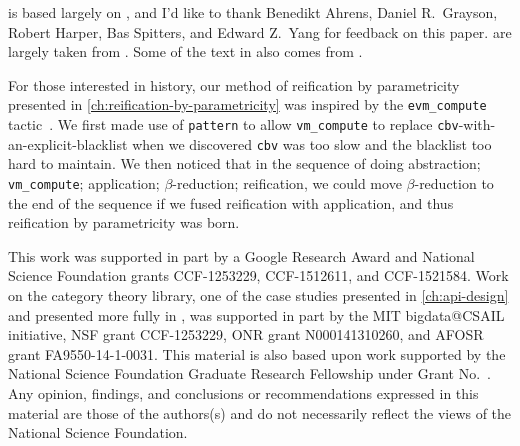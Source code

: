  is based largely on , and I'd like to thank Benedikt Ahrens, Daniel R.~Grayson, Robert Harper, Bas Spitters, and Edward Z.~Yang for feedback on this paper.
 are largely taken from .
Some of the text in  also comes from .


For those interested in history, our method of reification by parametricity presented in \autoref{ch:reification-by-parametricity} was inspired by the \texttt{evm\_compute} tactic~\cite{MirrorShardITP14}.
We first made use of \texttt{pattern} to allow \texttt{vm\_compute} to replace \texttt{cbv}-with-an-explicit-blacklist when we discovered \texttt{cbv} was too slow and the blacklist too hard to maintain.
We then noticed that in the sequence of doing abstraction; \texttt{vm\_compute}; application; $\beta$-reduction; reification, we could move $\beta$-reduction to the end of the sequence if we fused reification with application, and thus reification by parametricity was born.

This work was supported in part by a Google Research Award and National Science Foundation grants CCF-1253229, CCF-1512611, and CCF-1521584.
Work on the category theory library, one of the case studies presented in \autoref{ch:api-design} and presented more fully in , was supported in part by the MIT bigdata@CSAIL initiative, NSF grant CCF-1253229, ONR grant N000141310260, and AFOSR grant FA9550-14-1-0031.
This material is also based upon work supported by the National Science Foundation Graduate Research Fellowship under Grant No.\ .
Any opinion, findings, and conclusions or recommendations expressed in this material are those of the authors(s) and do not necessarily reflect the views of the National Science Foundation.


